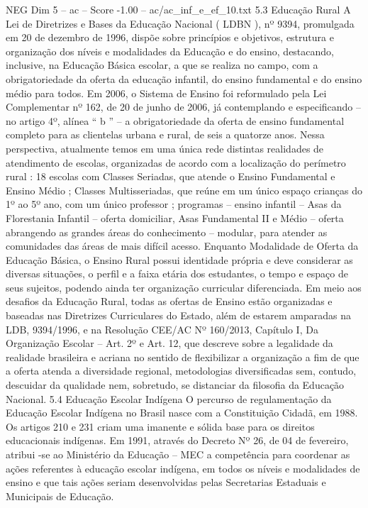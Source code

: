 \begin{textsample}{NEG Dim 5 – ac – Score -1.00 – ac/ac\_inf\_e\_ef\_10.txt}  \label{ex:f5_neg_163}
5.3 Educação Rural A Lei de Diretrizes e Bases da Educação Nacional ( LDBN ), nº 9394, promulgada em 20 de dezembro de 1996, dispõe sobre princípios e objetivos, estrutura e organização dos níveis e modalidades da Educação e do ensino, destacando, inclusive, na Educação Básica escolar, a que se realiza no campo, com a obrigatoriedade da oferta da educação infantil, do ensino fundamental e do ensino médio para todos.
Em 2006, o Sistema de Ensino foi reformulado pela Lei Complementar nº 162, de 20 de junho de 2006, já contemplando e especificando – no artigo 4º, alínea “ b ” – a obrigatoriedade da oferta de ensino fundamental completo para as clientelas urbana e rural, de seis a quatorze anos.
Nessa perspectiva, atualmente temos em uma única rede distintas realidades de atendimento de escolas, organizadas de acordo com a localização do perímetro rural : 18 escolas com Classes Seriadas, que atende o Ensino Fundamental e Ensino Médio ; Classes Multisseriadas, que reúne em um único espaço crianças do 1º ao 5º ano, com um único professor ; programas – ensino infantil – Asas da Florestania Infantil – oferta domiciliar, Asas Fundamental II e Médio – oferta abrangendo as grandes áreas do conhecimento – modular, para atender as comunidades das áreas de mais difícil acesso.
Enquanto Modalidade de Oferta da Educação Básica, o Ensino Rural possui identidade própria e deve considerar as diversas situações, o perfil e a faixa etária dos estudantes, o tempo e espaço de seus sujeitos, podendo ainda ter organização curricular diferenciada.
Em meio aos desafios da Educação Rural, todas as ofertas de Ensino estão organizadas e baseadas nas Diretrizes Curriculares do Estado, além de estarem amparadas na LDB, 9394/1996, e na Resolução CEE/AC Nº 160/2013, Capítulo I, Da Organização Escolar – Art. 2º e Art. 12, que descreve sobre a legalidade da realidade brasileira e acriana no sentido de flexibilizar a organização a fim de que a oferta atenda a diversidade regional, metodologias diversificadas sem, contudo, descuidar da qualidade nem, sobretudo, se distanciar da filosofia da Educação Nacional. 5.4 Educação Escolar Indígena O percurso de regulamentação da Educação Escolar Indígena no Brasil nasce com a Constituição Cidadã, em 1988.
Os artigos 210 e 231 criam uma imanente e sólida base para os direitos educacionais indígenas.
Em 1991, através do Decreto Nº 26, de 04 de fevereiro, atribui -se ao Ministério da Educação – MEC a competência para coordenar as ações referentes à educação escolar indígena, em todos os níveis e modalidades de ensino e que tais ações seriam desenvolvidas pelas Secretarias Estaduais e Municipais de Educação.

\end{textsample}
